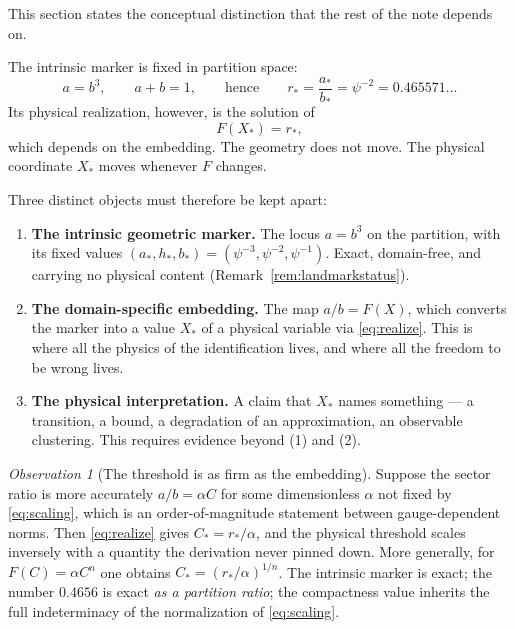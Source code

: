 \documentclass[11pt,a4paper]{article}
\theoremstyle{definition}
\theoremstyle{plain}
\theoremstyle{remark}
\newtheorem{observation}[definition]{Observation}
\begin{document}
This section states the conceptual distinction that the rest of the note
depends on.

The intrinsic marker is fixed in partition space:
\begin{equation}
a=b^{3},\qquad a+b=1,
\qquad\text{hence}\qquad
r_{*}=\frac{a_{*}}{b_{*}}=\psi^{-2}=0.465571\ldots
\label{eq:rstar}
\end{equation}
Its physical realization, however, is the solution of
\begin{equation}
F(X_{*})=r_{*} ,
\label{eq:realize}
\end{equation}
which depends on the embedding. The geometry does not move. The physical
coordinate $X_{*}$ moves whenever $F$ changes.

Three distinct objects must therefore be kept apart:

\begin{enumerate}[label=\textbf{(\arabic*)},leftmargin=*]
\item \textbf{The intrinsic geometric marker.} The locus $a=b^{3}$ on the
partition, with its fixed values $(a_{*},h_{*},b_{*})=(\psi^{-3},\psi^{-2},\psi^{-1})$.
Exact, domain-free, and carrying no physical content
(Remark~\ref{rem:landmarkstatus}).

\item \textbf{The domain-specific embedding.} The map $a/b=F(X)$, which
converts the marker into a value $X_{*}$ of a physical variable via
\eqref{eq:realize}. This is where all the physics of the identification lives,
and where all the freedom to be wrong lives.

\item \textbf{The physical interpretation.} A claim that $X_{*}$ names
something --- a transition, a bound, a degradation of an approximation, an
observable clustering. This requires evidence beyond (1) and (2).
\end{enumerate}

\begin{observation}[The threshold is as firm as the embedding]
\label{obs:firmness}
Suppose the sector ratio is more accurately $a/b=\alpha C$ for some
dimensionless $\alpha$ not fixed by \eqref{eq:scaling}, which is an
order-of-magnitude statement between gauge-dependent norms. Then
\eqref{eq:realize} gives $C_{*}=r_{*}/\alpha$, and the physical threshold
scales inversely with a quantity the derivation never pinned down. More
generally, for $F(C)=\alpha C^{n}$ one obtains
$C_{*}=(r_{*}/\alpha)^{1/n}$. The intrinsic marker is exact; the number
$0.4656$ is exact \emph{as a partition ratio}; the compactness value inherits
the full indeterminacy of the normalization of \eqref{eq:scaling}.
\end{observation}
\end{document}
